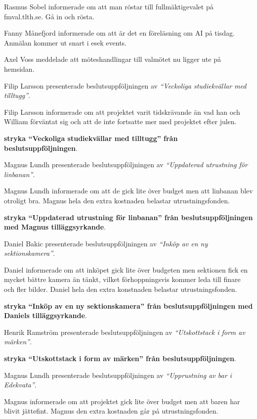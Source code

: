 \documentclass[10pt]{article}
\begin{document}
\begin{paragrafer}
Rasmus Sobel informerade om att man röstar till fullmäktigevalet på fmval.tlth.se. Gå in och rösta.

Fanny Månefjord informerade om att är det en föreläsning om AI på tisdag. Anmälan kommer ut snart i esek events.

Axel Voss meddelade att möteshandlingar till valmötet nu ligger ute på hemsidan.

\newpage
{}

Filip Larsson presenterade beslutsuppföljningen av \emph{``Veckoliga studiekvällar med tilltugg''}. 

Filip Larsson informerade om att projektet varit tidskrävande än vad han och William förväntat sig och att de inte fortsatte mer med projektet efter julen.

\textbf{\Mba stryka ``Veckoliga studiekvällar med tilltugg'' från beslutsuppföljningen}.

Magnus Lundh presenterade beslutsuppföljningen av \emph{``Uppdaterad utrustning för linbanan''}.

Magnus Lundh informerade om att de gick lite över budget men att linbanan blev otroligt bra. Magnus \ypa hela den extra kostnaden belastar utrustningsfonden.

\textbf{\Mba stryka ``Uppdaterad utrustning för linbanan'' från beslutsuppföljningen med Magnus tilläggsyrkande}.

Daniel Bakic presenterade beslutsuppföljningen av \emph{``Inköp av en ny sektionskamera''}.

Daniel informerade om att inköpet gick lite över budgeten men sektionen fick en mycket bättre kamera än tänkt, vilket förhoppningsvis kommer leda till finare och fler bilder. Daniel \ypa hela den extra konstnaden belastar utrustningsfonden.

\textbf{\Mba stryka ``Inköp av en ny sektionskamera'' från beslutsuppföljningen med Daniels tilläggsyrkande}.

Henrik Ramström presenterade beslutsuppföljningen av \emph{``Utskottstack i form av märken''}.

\textbf{\Mba stryka ``Utskottstack i form av märken'' från beslutsuppföljningen}.

Magnus Lundh presenterade beslutsuppföljningen av \emph{``Upprustning av bar i Edekvata''}.

Magnus informerade om att projektet gick lite över budget men att baren har blivit jättefint. Magnus \ypa den extra kostnaden går på utrustningsfonden.


\end{paragrafer}
\end{document}
